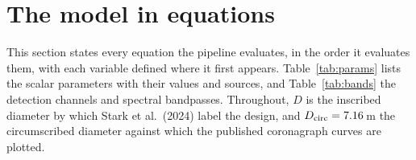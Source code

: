 \documentclass[11pt,a4paper]{article}
\begin{document}
\section{The model in equations}
\label{sec:equations}

This section states every equation the pipeline evaluates, in the order it evaluates them, with
each variable defined where it first appears. Table~\ref{tab:params} lists the scalar parameters
with their values and sources, and Table~\ref{tab:bands} the detection channels and spectral
bandpasses. Throughout, $D$ is the inscribed diameter by which Stark et al.\ (2024) label the
design, and $D_{\rm circ} = 7.16$\,m the circumscribed diameter against which the published
coronagraph curves are plotted.
\end{document}
